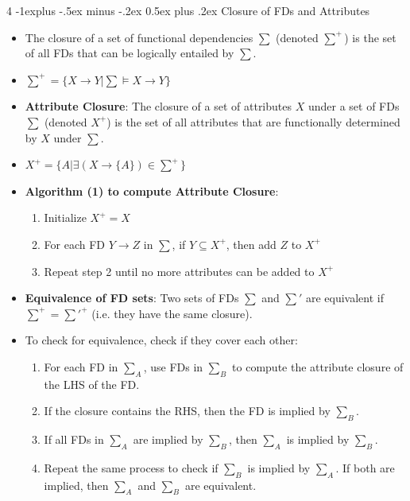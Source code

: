 \documentclass[10pt, landscape]{article}
\makeatletter
\renewcommand{\subsection}{\@startsection{subsection}{2}{0mm}%
  {-1explus -.5ex minus -.2ex}%
  {0.5ex plus .2ex}%
{\normalfont\normalsize\bfseries}}
\makeatother
\begin{document}
\begin{multicols*}{4}
  \subsection{Closure of FDs and Attributes}
  \begin{itemize}
    \item The closure of a set of functional dependencies $\sum$ (denoted $\sum^+$) is the set of all FDs that can be logically entailed by $\sum$.
    \item $\sum^+ = \{ X \rightarrow Y | \sum \models X \rightarrow Y \}$
    \item \textbf{Attribute Closure}: The closure of a set of attributes $X$ under a set of FDs $\sum$ (denoted $X^+$) is the set of all attributes that are functionally determined by $X$ under $\sum$.
    \item $X^+ = \{ A | \exists (X \rightarrow \{A\}) \in \sum^+ \}$
    \item \textbf{Algorithm (1) to compute Attribute Closure}:
    \begin{enumerate}
        \item Initialize $X^+ = X$
        \item For each FD $Y \rightarrow Z$ in $\sum$, if $Y \subseteq X^+$, then add $Z$ to $X^+$
        \item Repeat step 2 until no more attributes can be added to $X^+$
    \end{enumerate}
    \item \textbf{Equivalence of FD sets}: Two sets of FDs $\sum$ and $\sum'$ are equivalent if $\sum^+ = \sum'^+$ (i.e. they have the same closure).
    \item To check for equivalence, check if they cover each other:
    \begin{enumerate}
        \item For each FD in $\sum_A$, use FDs in $\sum_B$ to compute the attribute closure of the LHS of the FD. 
        \item If the closure contains the RHS, then the FD is implied by $\sum_B$. 
        \item If all FDs in $\sum_A$ are implied by $\sum_B$, then $\sum_A$ is implied by $\sum_B$. 
        \item Repeat the same process to check if $\sum_B$ is implied by $\sum_A$. If both are implied, then $\sum_A$ and $\sum_B$ are equivalent.
    \end{enumerate}
  \end{itemize}


\end{multicols*}
\end{document}
